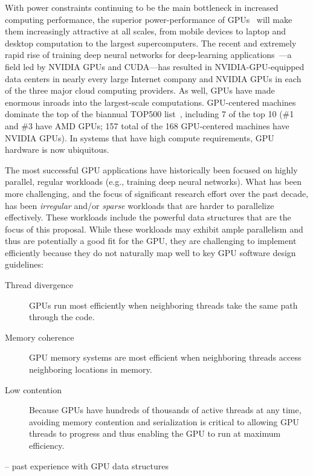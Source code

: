 With power constraints continuing to be the main bottleneck in increased computing performance, the superior power-performance of GPUs~\cite{Dally:2010:GCT} will make them increasingly attractive at all scales, from mobile devices to laptop and desktop computation to the largest supercomputers. The recent and extremely rapid rise of training deep neural networks for deep-learning applications~\cite{Amodei:2015:DS2,Chetlur:2014:CEP,Coates:2013:DLW,Hannun:2014:DSU}---a field led by NVIDIA GPUs and CUDA---has resulted in NVIDIA-GPU-equipped data centers in nearly every large Internet company and NVIDIA GPUs in each of the three major cloud computing providers. As well, GPUs have made enormous inroads into the largest-scale computations. GPU-centered machines dominate the top of the biannual TOP500 list~\cite{top500:nov2022}, including 7 of the top 10 (\#1 and \#3 have AMD GPUs; 157 total of the 168 GPU-centered machines have NVIDIA GPUs). In systems that have high compute requirements, GPU hardware is now ubiquitous.

The most successful GPU applications have historically been focused on highly parallel, regular workloads (e.g., training deep neural networks). What has been more challenging, and the focus of significant research effort over the past decade, has been \emph{irregular} and/or \emph{sparse} workloads that are harder to parallelize effectively. These workloads include the powerful data structures that are the focus of this proposal. While these workloads may exhibit ample parallelism and thus are potentially a good fit for the GPU, they are challenging to implement efficiently because they do not naturally map well to key GPU software design guidelines:

\begin{description}
  \item[Thread divergence] GPUs run most efficiently when neighboring threads take the same path through the code.
  \item[Memory coherence] GPU memory systems are most efficient when neighboring threads access neighboring locations in memory.
  \item[Low contention] Because GPUs have hundreds of thousands of active threads at any time, avoiding memory contention and serialization is critical to allowing GPU threads to progress and thus enabling the GPU to run at maximum efficiency.
\end{description}


-- past experience with GPU data structures





